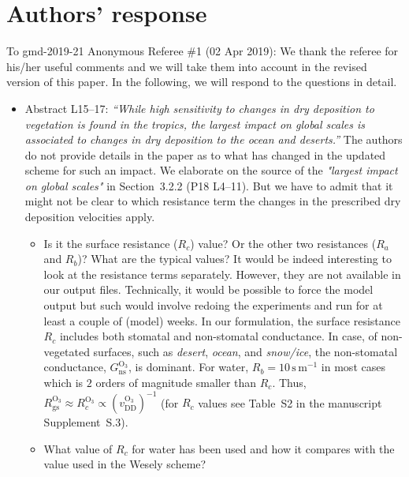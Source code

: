 
%
\section*{Authors' response}
To gmd-2019-21 Anonymous Referee \#1 (02 Apr 2019):
We thank the referee for his/her useful comments and we will take them into account in the revised version of this paper.
In the following, we will respond to the questions in detail.
\begin{itemize}
\item {\color{blue}  Abstract L15--17: \emph{“While high sensitivity to changes in dry deposition to
    vegetation is found in the tropics, the largest impact on global scales is associated to
    changes in dry deposition to the ocean and deserts.”} The authors do not provide details
  in the paper as to what has changed in the updated scheme for such an impact.}
  We elaborate on the source of the \emph{"largest impact on global scales"} in Section~3.2.2 (P18 L4--11). But we have to admit that it might not be clear to which resistance term the changes in the prescribed dry deposition velocities apply. 
  \begin{itemize}
  \item {\color{blue} Is it the surface resistance ($R_c$) value? Or the other two resistances ($R_a$ and $R_b$)? What are the typical values?}
    It would be indeed interesting to look at the resistance terms separately. However, they are not available in our output files.
    Technically, it would be possible to force the model output but such would involve redoing the experiments and run for at least a couple of (model) weeks. In our formulation, the surface resistance $R_c$ includes both stomatal and non-stomatal conductance. In case, of non-vegetated surfaces, such as \emph{desert}, \emph{ocean}, and \emph{snow/ice}, the non-stomatal conductance, $G_\mathrm{ns}^\mathrm{O_3}$, is dominant. For water, $R_b = 10\,\mathrm{s\,m^{-1}}$ in most cases which is $2$ orders of magnitude smaller than $R_c$. Thus, $R_\mathrm{gs}^\mathrm{O_3} \approx R_c^\mathrm{O_3} \propto (v_\mathrm{DD}^\mathrm{O_3})^{-1}$ (for $R_c$ values see Table~S2 in the manuscript Supplement~S.3).
  \item {\color{blue} What value of $R_c$ for water has been used and how it compares with the value used in the Wesely scheme?}

\end{itemize}
\end{itemize}
